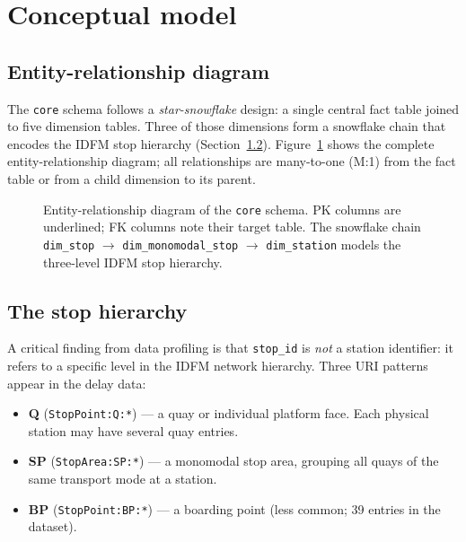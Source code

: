\documentclass[a4paper,11pt]{article}
\begin{document}
\section{Conceptual model}
\label{sec:conceptual}

\subsection{Entity-relationship diagram}

The \texttt{core} schema follows a \emph{star-snowflake} design: a single central
fact table joined to five dimension tables.
Three of those dimensions form a snowflake chain that encodes the IDFM stop hierarchy
(Section~\ref{sec:stop-hierarchy}).
Figure~\ref{fig:er} shows the complete entity-relationship diagram; all relationships
are many-to-one (M:1) from the fact table or from a child dimension to its parent.

\begin{figure}[H]
  \centering
  
  \caption{Entity-relationship diagram of the \texttt{core} schema.
    PK columns are underlined; FK columns note their target table.
    The snowflake chain \texttt{dim\_stop} $\to$ \texttt{dim\_monomodal\_stop}
    $\to$ \texttt{dim\_station} models the three-level IDFM stop hierarchy.}
  \label{fig:er}
\end{figure}

\subsection{The stop hierarchy}
\label{sec:stop-hierarchy}

A critical finding from data profiling is that \texttt{stop\_id} is \emph{not}
a station identifier: it refers to a specific level in the IDFM network hierarchy.
Three URI patterns appear in the delay data:

\begin{itemize}
  \item \textbf{Q} (\texttt{StopPoint:Q:*}) --- a quay or individual platform face.
    Each physical station may have several quay entries.
  \item \textbf{SP} (\texttt{StopArea:SP:*}) --- a monomodal stop area, grouping
    all quays of the same transport mode at a station.
  \item \textbf{BP} (\texttt{StopPoint:BP:*}) --- a boarding point (less common;
    39 entries in the dataset).
\end{itemize}
\end{document}
